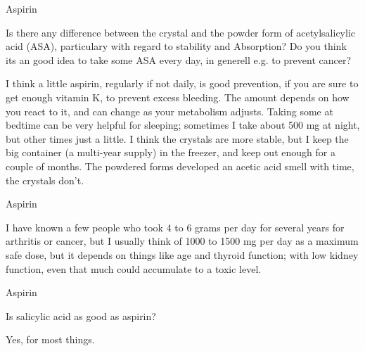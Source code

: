 \documentclass[11pt,oneside,openany,extrafontsizes]{memoir}
\begin{document}
\begin{qaexchange}{Aspirin}

    \begin{question}
        Is there any difference between the crystal and the powder form of acetylsalicylic acid (ASA), particulary with regard to stability and Absorption? Do you think its an good idea to take some ASA every day, in generell e.g. to prevent cancer?
    \end{question}

    \begin{answer}
      I think a little aspirin, regularly if not daily, is good prevention, if you are sure to get enough vitamin K, to prevent excess bleeding. The amount depends on how you react to it, and can change as your metabolism adjusts. Taking some at bedtime can be very helpful for sleeping; sometimes I take about 500 mg at night, but other times just a little. I think the crystals are more stable, but I keep the big container (a multi-year supply) in the freezer, and keep out enough for a couple of months. The powdered forms developed an acetic acid smell with time, the crystals don't.
    \end{answer}
\end{qaexchange}

\begin{standalonequote}{Aspirin}

    \begin{answer}
       I have known a few people who took 4 to 6 grams per day for several years for arthritis or cancer, but I usually think of 1000 to 1500 mg per day as a maximum safe dose, but it depends on things like age and thyroid function; with low kidney function, even that much could accumulate to a toxic level.
    \end{answer}
\end{standalonequote}

\begin{qaexchange}{Aspirin}

    \begin{question}
        Is salicylic acid as good as aspirin?
    \end{question}

    \begin{answer}
      Yes, for most things.
    \end{answer}
\end{qaexchange}
\end{document}
